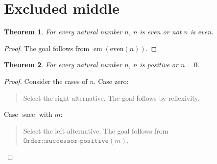 \documentclass[11pt]{article}
\newtheorem{theorem}{Theorem}[section]
\theoremstyle{definition}
\begin{document}
\section{Excluded middle}
\label{ll:main:excluded-middle}
\begin{theorem}
\label{ll:main:even-or-not}
For every natural number \(n\), \(n\) is even or not \(n\) is even.
\end{theorem}
\begin{proof}
The goal follows from \(\operatorname{em}(\text{even}(n))\).
\end{proof}
\begin{theorem}
\label{ll:main:positive-or-zero}
For every natural number \(n\), \(n\) is positive or \(n = 0\).
\end{theorem}
\begin{proof}
Consider the cases of \(n\).
Case zero:
\begin{quote}
Select the right alternative.
The goal follows by reflexivity.
\end{quote}
Case \(\operatorname{succ}\) with \(m\):
\begin{quote}
Select the left alternative.
The goal follows from \(\texttt{Order::successor-positive}(m)\).
\end{quote}
\end{proof}
\end{document}
